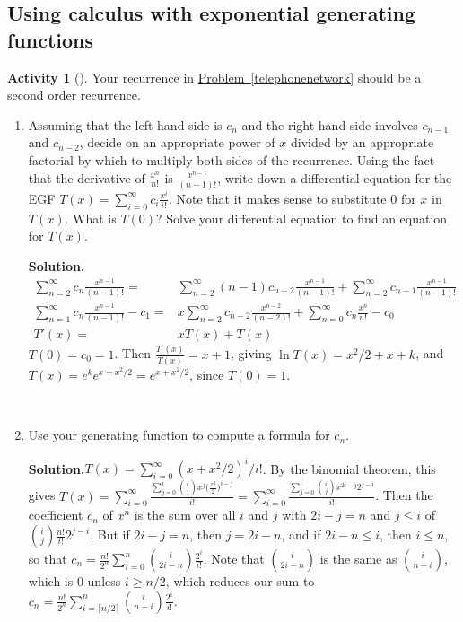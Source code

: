 \documentclass[10pt,]{book}
\theoremstyle{plain}
\theoremstyle{definition}
\newtheorem{activity}[project]{Activity}
\numberwithin{equation}{chapter}
\newcommand{\amp}{&}
\begin{document}
\typeout{************************************************}
\typeout{************************************************}
\subsection[{Using calculus  with exponential generating functions}]{Using calculus  with exponential generating functions}\label{subsection-77}
\begin{activity}[]\label{activity-351}
Your recurrence in \hyperref[telephonenetwork]{Problem~\ref{telephonenetwork}} should be a second order recurrence.%
~\par
\begin{enumerate}[label=(\alph*)]
 \item Assuming that the left hand side is \(c_n\) and the right hand side involves \(c_{n-1}\) and \(c_{n-2}\), decide on an appropriate power of \(x\) divided by an appropriate factorial by which to multiply both sides of the recurrence.  Using the fact that the derivative of \(\frac{x^n}{n!}\) is \(\frac{x^{n-1}}{(n-1)!}\), write down a differential equation for the EGF \(T(x) =
\sum_{i=0}^\infty c_i\frac{x^i}{i!}\).  Note that it makes sense to substitute 0 for \(x\) in \(T(x)\).  What is \(T(0)\)?  Solve your differential equation to find an equation for \(T(x)\).%
\par\medskip\noindent%
\textbf{Solution.}\quad %
\begin{align*}
\sum_{n=2}^\infty c_n\frac{x^{n-1}}{(n-1)!}
\! =\amp \!\sum_{n=2}^\infty(n-1) c_{n-2}\frac{x^{n-1}}{(n-1)!} +
\sum_{n=2}^\infty c_{n-1}\frac{x^{n-1}}{(n-1)!}\\
\sum_{n=1}^\infty c_n\frac{x^{n-1}}{(n-1)!}- c_1 \! =\amp \! x\sum_{n=2}^\infty
c_{n-2}\frac{x^{n-2}}{(n-2)!} + \sum_{n=0}^\infty c_n\frac{x^n}{n!} -c_0\\
T'(x)\! =\amp \!xT(x) +T(x)
\end{align*}
\(T(0) = c_0 =1\). Then \(\frac{T'(x)}{T(x)} = x+1\), giving \(\ln T(x)
=x^2/2+x+k\), and \(T(x) =e^ke^{x+ x^2/2}=e^{x+x^2/2}\), since \(T(0)=1\).%

~\par
\item Use your generating function to compute a formula for \(c_n\).%
\par\medskip\noindent%
\textbf{Solution.}\quad \(T(x) = \sum_{i=0}^\infty (x+x^2/2)^i/i!\). By the binomial theorem, this gives \(T(x) = \sum_{i=0}^\infty \frac{\sum_{j=0}^i \binom{i}{j}x^j\bigl(\frac{x^2}{2}\bigr)^{i-j}}{
i!}=\sum_{i=0}^\infty\frac{\sum_{j=0}^i\binom{i}{j}x^{2i-j}2^{j-i}}{i!}\). Then the coefficient \(c_n\) of \(x^n\) is the sum over all \(i\) and \(j\) with \(2i-j=n\) and \(j\le i\) of \(\binom{i}{j}\frac{n!}{i!}2^{j-i}\). But if \(2i-j=n\), then \(j= 2i-n\), and if \(2i-n\le i\), then \(i\le n\), so that \(c_n
= \frac{n!}{2^n}\sum_{i=0}^n\binom{i}{2i-n}\frac{2^i}{i!}\). Note that \(\binom{i}{2i-n}\) is the same as \(\binom{i}{n-i}\), which is 0 unless \(i\ge
n/2\), which reduces our sum to \(c_n = \frac{n!}{2^n}\sum_{i=\lceil n/2\rceil}^n\binom{i}{n-i}\frac{2^i}{i!}\).%

\end{enumerate}
\end{activity}
\end{document}
